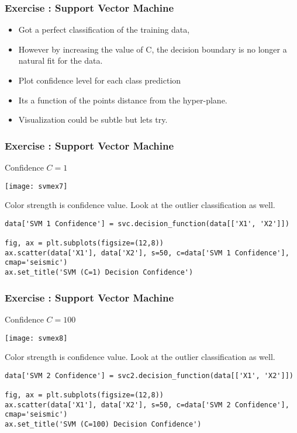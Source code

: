 \begin{frame}[fragile]\frametitle{Exercise : Support Vector Machine}
\begin{itemize}
\item  Got a perfect classification of the training data, 
\item However by increasing the value of C, the decision boundary is no longer a natural fit for the data. 
\item Plot confidence level for each class prediction
\item Its a function of the points distance from the hyper-plane.
\item Visualization could be subtle but lets try.
\end{itemize}
\end{frame}

\begin{frame}[fragile]\frametitle{Exercise : Support Vector Machine}
Confidence $C=1$
\begin{center}
\texttt{[image: svmex7]}
\end{center}
Color strength is confidence value. Look at the outlier classification as well.

\begin{lstlisting}
data['SVM 1 Confidence'] = svc.decision_function(data[['X1', 'X2']])

fig, ax = plt.subplots(figsize=(12,8))
ax.scatter(data['X1'], data['X2'], s=50, c=data['SVM 1 Confidence'], cmap='seismic')
ax.set_title('SVM (C=1) Decision Confidence')
\end{lstlisting}

\end{frame}


\begin{frame}[fragile]\frametitle{Exercise : Support Vector Machine}
Confidence $C=100$
\begin{center}
\texttt{[image: svmex8]}
\end{center}
Color strength is confidence value. Look at the outlier classification as well.

\begin{lstlisting}
data['SVM 2 Confidence'] = svc2.decision_function(data[['X1', 'X2']])

fig, ax = plt.subplots(figsize=(12,8))
ax.scatter(data['X1'], data['X2'], s=50, c=data['SVM 2 Confidence'], cmap='seismic')
ax.set_title('SVM (C=100) Decision Confidence')
\end{lstlisting}

\end{frame}

